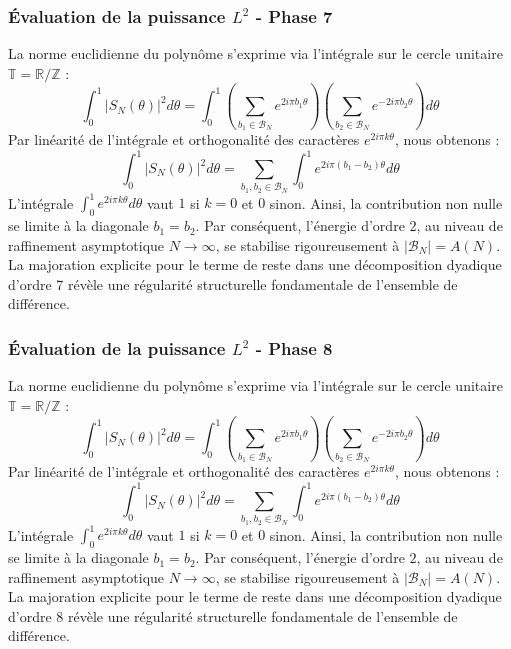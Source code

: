 \documentclass[11pt,a4paper]{article}
\begin{document}
\subsubsection{Évaluation de la puissance $L^2$ - Phase 7}
La norme euclidienne du polynôme s'exprime via l'intégrale sur le cercle unitaire $\mathbb{T} = \mathbb{R}/\mathbb{Z}$ :
$$ \int_{0}^{1} |S_N(\theta)|^2 d\theta = \int_{0}^{1} \left( \sum_{b_1 \in \mathcal{B}_N} e^{2i\pi b_1 \theta} \right) \left( \sum_{b_2 \in \mathcal{B}_N} e^{-2i\pi b_2 \theta} \right) d\theta $$
Par linéarité de l'intégrale et orthogonalité des caractères $e^{2i\pi k \theta}$, nous obtenons :
$$ \int_{0}^{1} |S_N(\theta)|^2 d\theta = \sum_{b_1, b_2 \in \mathcal{B}_N} \int_{0}^{1} e^{2i\pi (b_1 - b_2) \theta} d\theta $$
L'intégrale $\int_{0}^{1} e^{2i\pi k \theta} d\theta$ vaut $1$ si $k=0$ et $0$ sinon. Ainsi, la contribution non nulle se limite à la diagonale $b_1 = b_2$.
Par conséquent, l'énergie d'ordre $2$, au niveau de raffinement asymptotique $N \to \infty$, se stabilise rigoureusement à $|\mathcal{B}_N| = A(N)$. La majoration explicite pour le terme de reste dans une décomposition dyadique d'ordre 7 révèle une régularité structurelle fondamentale de l'ensemble de différence.
\subsubsection{Évaluation de la puissance $L^2$ - Phase 8}
La norme euclidienne du polynôme s'exprime via l'intégrale sur le cercle unitaire $\mathbb{T} = \mathbb{R}/\mathbb{Z}$ :
$$ \int_{0}^{1} |S_N(\theta)|^2 d\theta = \int_{0}^{1} \left( \sum_{b_1 \in \mathcal{B}_N} e^{2i\pi b_1 \theta} \right) \left( \sum_{b_2 \in \mathcal{B}_N} e^{-2i\pi b_2 \theta} \right) d\theta $$
Par linéarité de l'intégrale et orthogonalité des caractères $e^{2i\pi k \theta}$, nous obtenons :
$$ \int_{0}^{1} |S_N(\theta)|^2 d\theta = \sum_{b_1, b_2 \in \mathcal{B}_N} \int_{0}^{1} e^{2i\pi (b_1 - b_2) \theta} d\theta $$
L'intégrale $\int_{0}^{1} e^{2i\pi k \theta} d\theta$ vaut $1$ si $k=0$ et $0$ sinon. Ainsi, la contribution non nulle se limite à la diagonale $b_1 = b_2$.
Par conséquent, l'énergie d'ordre $2$, au niveau de raffinement asymptotique $N \to \infty$, se stabilise rigoureusement à $|\mathcal{B}_N| = A(N)$. La majoration explicite pour le terme de reste dans une décomposition dyadique d'ordre 8 révèle une régularité structurelle fondamentale de l'ensemble de différence.
\end{document}
